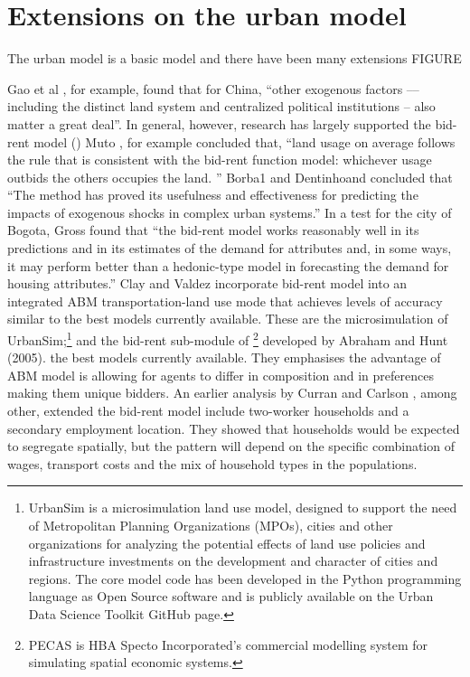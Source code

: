 \section{Extensions on the urban model}

The urban model is a basic model and there have been many extensions FIGURE

Gao et al \cite{GaoJinlong2020BtbT}, for example,  found  that for China, ``other exogenous  factors –– including the distinct land system  and centralized political institutions -- also matter a great deal''. In general, however, 
research has largely supported the bid-rent model (\cite{mutoEstimationBidRent2006, wheatonBidRentApproach1977}) Muto \cite{mutoEstimationBidRent2006}, for example concluded that,  ``land usage on average follows the rule that is consistent with the bid-rent function model: whichever usage outbids the others occupies the land. ''  Borba1 and Dentinhoand \cite{borbaEvaluationUrbanScenarios2016} concluded that ``The method has proved its usefulness and effectiveness for predicting the impacts of exogenous shocks in complex urban systems.'' 
%
In a test for the city of Bogota, Gross \cite{grossEstimatingWillingnessPay1988} found that  ``the bid-rent model works reasonably well in its predictions and in its estimates of the demand for attributes and, in some ways, it may perform better than a hedonic-type model in forecasting the demand for housing attributes.'' 
%
Clay and Valdez incorporate bid-rent model into an integrated ABM transportation-land use mode that achieves levels of accuracy similar to the best models currently available. These are the microsimulation of UrbanSim;\footnote{UrbanSim is a microsimulation land use model, designed to support the need of Metropolitan Planning Organizations (MPOs), cities and other organizations for analyzing the potential effects of land use policies and infrastructure investments on the development and character of cities and regions. The core model code has been developed in the Python programming language as Open Source software and is publicly available on the Urban Data Science Toolkit GitHub page.\cite{waddellmodellinurbandev2002}} and the bid-rent sub-module of \footnote{PECAS is  HBA Specto Incorporated's commercial modelling system  for simulating spatial economic systems.} developed by Abraham and Hunt (2005). the best models currently available. They emphasises the advantage of ABM model is allowing for agents to differ in composition and in preferences making them unique bidders. 
An earlier analysis by Curran and Carlson \cite{curranTheoryResidentialLocation1982}, among other, extended the bid-rent model include two-worker households and a secondary employment location. They showed that households would be expected to segregate spatially, but the pattern will depend on the specific combination of wages, transport costs and the mix of household types in the populations. 


